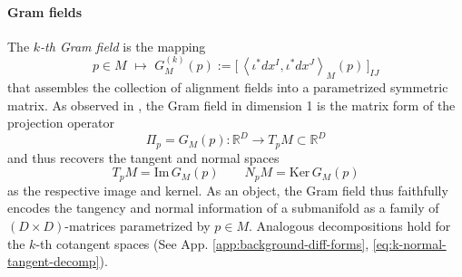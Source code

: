 \documentclass{article}
\newcommand{\R}{\mathbb{R}}
\theoremstyle{remark}
\theoremstyle{plain}
\begin{document}
\paragraph{Gram fields} The \textit{$k$-th Gram field} is the mapping
\begin{equation}
    p \in M \, \, \mapsto \, \, G_M^{(k)}(p) := \Big[ \, \left\langle \iota^* dx^I,\iota^* dx^J \right\rangle_{M}(p) \, \Big]_{IJ} 
\end{equation} that assembles the collection of alignment fields into a parametrized symmetric matrix. As observed in \cite{jones2026manifolddiffusiongeometrycurvature, kawasaki2026diffusion}, the Gram field in dimension 1 is the matrix form of the projection operator
\begin{equation} 
    \Pi_p =G_M(p) : \R^D \to T_pM \subset \R^D
\end{equation} and thus recovers the tangent and normal spaces
\begin{equation}\label{eq:gramfield-decomposition}
    T_p M = \text{Im} \,G_M(p) \qquad  N_pM = \text{Ker} \, G_M(p)
\end{equation} as the respective image and kernel. As an object, the Gram field thus faithfully encodes the tangency and normal information of a submanifold as a family of $(D \times D)$-matrices parametrized by $p \in M$. Analogous decompositions hold for the $k$-th cotangent spaces (See App. \ref{app:background-diff-forms}, \ref{eq:k-normal-tangent-decomp}).
\end{document}

